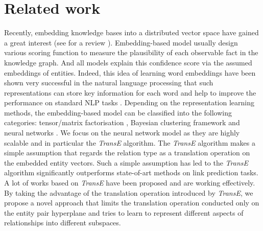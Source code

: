 \documentclass[9pt]{sig-alternate-05-2015}
\begin{document}
\section{Related work} \label{review}
Recently, embedding knowledge bases into a distributed vector space have gained a great interest (see \cite{nickel_review_2015} for a review ). Embedding-based model usually design various scoring function to measure the plausibility of each observable fact in the knowledge graph. And all models explain this confidence score via the assumed embeddings of entities. Indeed, this idea of learning word embeddings  have been shown very successful in the natural language processing that such representations can store key information for each word and help to improve the performance on standard NLP tasks \cite{bengio_neural_2006}.  Depending on the representation learning methods, the embedding-based model can be classified into the following categories: tensor/matrix factorisation \cite{singh_relational_2008} \cite{nickel_three-way_2011}, Bayesian clustering framework \cite{kemp_learning_2006} \cite{sutskever_modelling_2009} and neural networks \cite{bordes_learning_2011} \cite{jenatton_latent_2012} \cite{bordes_translating_2013} \cite{socher_reasoning_2013} \cite{bordes_semantic_2014} \cite{wang_knowledge_2014} \cite{lin_learning_2015} \cite{garcia-duran_composing_2015}. We focus on the neural network model as they are highly scalable and in particular the \emph{TransE} \cite{bordes_translating_2013} algorithm. The \emph{TransE} algorithm makes a simple assumption that regards the relation type as a translation operation on the embedded entity vectors. Such a simple assumption has led to the \emph{TransE} algorithm significantly outperforms state-of-art methods on link prediction tasks. A lot of works \cite{fan_transition-based_2014} \cite{wang_knowledge_2014} \cite{lin_learning_2015} \cite{garcia-duran_composing_2015}  based on \emph{TransE} have been proposed and are working effectively. By taking the advantage of the translation operation introduced by \emph{TransE}, we propose a novel approach that limits the translation operation conducted only on the entity pair hyperplane and tries to learn to represent  different aspects of relationships into different subspaces.
\end{document}
